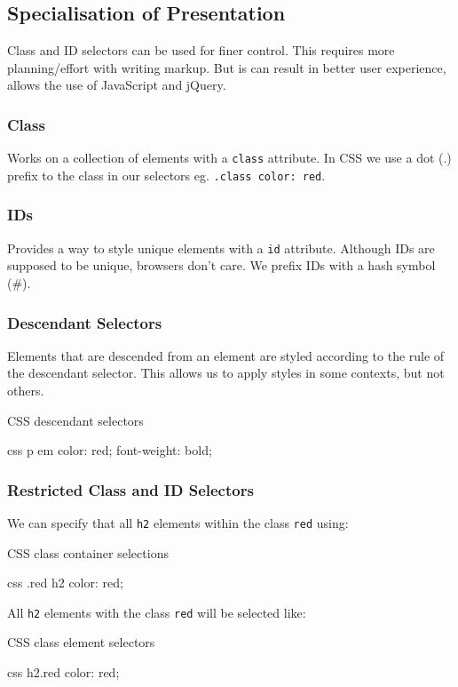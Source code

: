 \subsection{Specialisation of Presentation}\label{sub:specialisation_of_presentation}

Class and ID selectors can be used for finer control.
This requires more planning/effort with writing markup.
But is can result in better user experience, allows the use of JavaScript and jQuery.

\subsubsection{Class}\label{ssub:class}

Works on a collection of elements with a \texttt{class} attribute.
In CSS we use a dot (.) prefix to the class in our selectors eg. \texttt{.class {color: red}}.

\subsubsection{IDs}\label{ssub:ids}

Provides a way to style unique elements with a \texttt{id} attribute.
Although IDs are supposed to be unique, browsers don't care.
We prefix IDs with a hash symbol (\#).

\subsubsection{Descendant Selectors}\label{ssub:descendant_selectors}

Elements that are descended from an element are styled according to the rule of the descendant selector.
This allows us to apply styles in some contexts, but not others.
\begin{highlight}{CSS descendant selectors}
    \begin{code}{css}
        p em {color: red; font-weight: bold; }
    \end{code}
\end{highlight}

\subsubsection{Restricted Class and ID Selectors}\label{ssub:restricted_class_and_id_selectors}

We can specify that all \texttt{h2} elements within the class \texttt{red} using:
\begin{highlight}{CSS class container selections}
    \begin{code}{css}
        .red h2 {color: red;}
    \end{code}
\end{highlight}
All \texttt{h2} elements with the class \texttt{red} will be selected like:
\begin{highlight}{CSS class element selectors}
    \begin{code}{css}
        h2.red {color: red;}
    \end{code}
\end{highlight}
